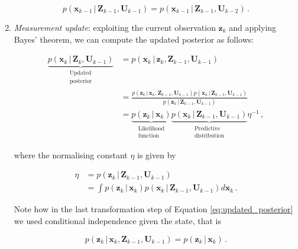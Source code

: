 \begin{enumerate}
\begin{equation}
  p(\bm{x}_{k-1}\,|\,\bm{Z}_{k-1}, \bm{U}_{k-1}) = p(\bm{x}_{k-1}\,|\,\bm{Z}_{k-1}, \bm{U}_{k-2})\,.
\end{equation}


\item \emph{Measurement update}: exploiting the current observation $\bm{z}_{k}$ and applying Bayes' theorem, we can compute the updated posterior as follows: 

\begin{equation}\label{eq:updated_posterior}
\begin{split}
  \underbrace{p(\bm{x}_k\,|\,\bm{Z}_{k}, \bm{U}_{k-1})}_{\substack{\text{Updated} \\ \text{posterior}}} &= p(\bm{x}_k\,|\,\bm{z}_{k}, \bm{Z}_{k-1}, \bm{U}_{k-1}) \\
  &= \frac{p(\bm{z}_k\,|\,\bm{x}_{k}, \bm{Z}_{k-1}, \bm{U}_{k-1}) p(\bm{x}_k\,|\,\bm{Z}_{k-1}, \bm{U}_{k-1})}{p(\bm{z}_{k}\,|\,\bm{Z}_{k-1}, \bm{U}_{k-1})} \\
  &= \underbrace{p(\bm{z}_k\,|\,\bm{x}_{k})}_{\substack{\text{Likelihood} \\ \text{function}}} \underbrace{p(\bm{x}_k\,|\,\bm{Z}_{k-1}, \bm{U}_{k-1})}_{\substack{\text{Predictive} \\ \text{distribution}}} \eta^{-1} \,,
\end{split}
\end{equation}

\noindent
where the normalising constant $\eta$ is given by

\begin{equation}\label{eq:partition_function}
\begin{split}
\eta &= p(\bm{z}_k\,|\,\bm{Z}_{k-1}, \bm{U}_{k-1}) \\ 
  &= \int p(\bm{z}_k\,|\,\bm{x}_{k}) p(\bm{x}_{k}\,|\,\bm{Z}_{k-1}, \bm{U}_{k-1}) d\bm{x}_{k}\,.
\end{split}
\end{equation}

\noindent
Note how in the last transformation step of Equation \ref{eq:updated_posterior} we used conditional independence given the state, that is
 
 \begin{equation}\label{eq:markov_property_observation}
  p(\bm{z}_k\,|\,\bm{x}_{k}, \bm{Z}_{k-1}, \bm{U}_{k-1}) = p(\bm{z}_k\,|\,\bm{x}_{k})\,.
\end{equation}
 
\end{enumerate}


